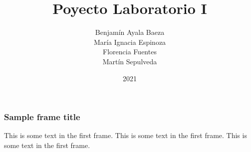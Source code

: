 \documentclass{beamer}
\title{Poyecto Laboratorio I}
\author{Benjamín Ayala Baeza \\ Mar\'ia Ignacia Espinoza \\ Florencia Fuentes \\ Mart\'in Sepulveda}
\institute{Overleaf}
\date{2021}
\begin{document}
\frame{\titlepage}

\begin{frame}
\frametitle{Sample frame title}
This is some text in the first frame. This is some text in the first frame. This is some text in the first frame.
\end{frame}
\end{document}
